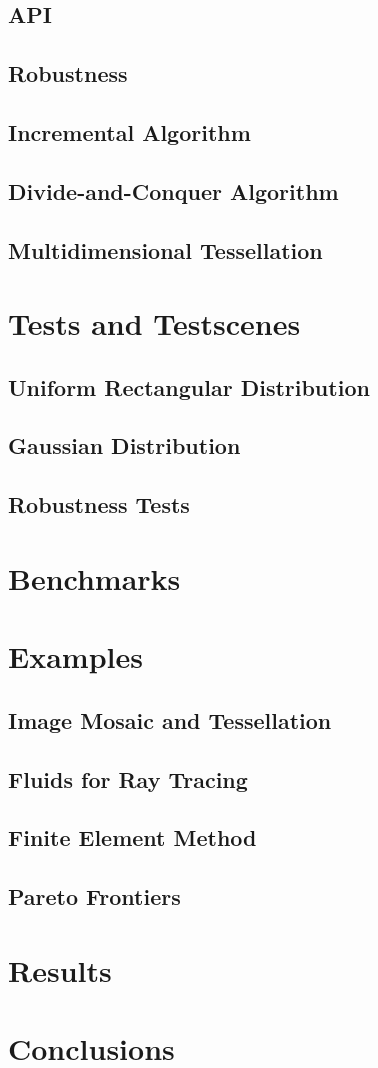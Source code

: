 \documentclass[10pt, twoside, fleqn]{article}
\let\oldsection\section
\renewcommand*\section{%
  \cleardoublepage
  \thispagestyle{sectionstyle}\oldsection}
\begin{document}
    \subsection{API}
    \subsection{Robustness}
    \subsection{Incremental Algorithm}
    \subsection{Divide-and-Conquer Algorithm}
    \subsection{Multidimensional Tessellation}
  \section{Tests and Testscenes}
    \subsection{Uniform Rectangular Distribution}
    \subsection{Gaussian Distribution}
    \subsection{Robustness Tests}
  \section{Benchmarks}
  \section{Examples}
    \subsection{Image Mosaic and Tessellation}
    \subsection{Fluids for Ray Tracing}
    \subsection{Finite Element Method}
    \subsection{Pareto Frontiers}
  \section{Results}
  \section{Conclusions}

  \nocite{*}
  \printbibliography[heading=bibintoc]
\end{document}
